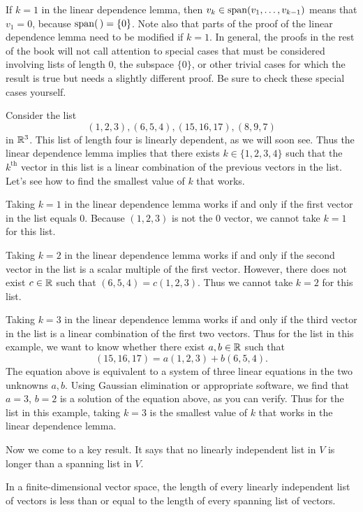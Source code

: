 If $k=1$ in the linear dependence lemma, then $v_k\in\operatorname{span}(v_1,\dots,v_{k-1})$
means that $v_1=0$, because $\operatorname{span}(\,)=\{0\}$. Note also that parts of the proof
of the linear dependence lemma need to be modified if $k=1$. In general, the
proofs in the rest of the book will not call attention to special cases that
must be considered involving lists of length $0$, the subspace $\{0\}$, or
other trivial cases for which the result is true but needs a slightly
different proof. Be sure to check these special cases yourself.

\begin{example}\label{ax:2.21}
Consider the list
\[ (1,2,3),(6,5,4),(15,16,17),(8,9,7) \]
in $\mathbb{R}^3$. This list of length four is linearly dependent, as we will soon see.
Thus the linear dependence lemma implies that there exists $k\in\{1,2,3,4\}$
such that the $k^{\text{th}}$ vector in this list is a linear combination of
the previous vectors in the list. Let's see how to find the smallest value of
$k$ that works.

Taking $k=1$ in the linear dependence lemma works if and only if the first
vector in the list equals $0$. Because $(1,2,3)$ is not the $0$ vector, we
cannot take $k=1$ for this list.

Taking $k=2$ in the linear dependence lemma works if and only if the second
vector in the list is a scalar multiple of the first vector. However, there
does not exist $c\in\mathbb{R}$ such that $(6,5,4)=c(1,2,3)$. Thus we cannot take
$k=2$ for this list.

Taking $k=3$ in the linear dependence lemma works if and only if the third
vector in the list is a linear combination of the first two vectors. Thus for
the list in this example, we want to know whether there exist $a,b\in\mathbb{R}$ such
that
\[ (15,16,17) = a(1,2,3)+b(6,5,4). \]
The equation above is equivalent to a system of three linear equations in the
two unknowns $a,b$. Using Gaussian elimination or appropriate software, we find
that $a=3$, $b=2$ is a solution of the equation above, as you can verify. Thus
for the list in this example, taking $k=3$ is the smallest value of $k$ that
works in the linear dependence lemma.
\end{example}

Now we come to a key result. It says that no linearly independent list in $V$
is longer than a spanning list in $V$.

\begin{result}\label{ax:2.22}
In a finite-dimensional vector space, the length of every linearly independent
list of vectors is less than or equal to the length of every spanning list of
vectors.
\end{result}

